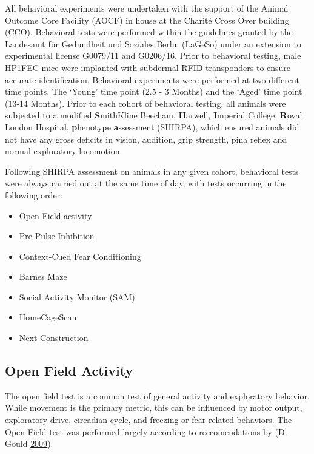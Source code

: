 \documentclass[onehalf,12pt]{beavtex}
\providecommand{\tightlist}{%
  \setlength{\itemsep}{0pt}\setlength{\parskip}{0pt}}
\begin{document}
  All behavioral experiments were undertaken with the support of the
  Animal Outcome Core Facility (AOCF) in house at the Charité Cross Over
  building (CCO). Behavioral tests were performed within the guidelines
  granted by the Landesamt für Gedundheit und Soziales Berlin (LaGeSo)
  under an extension to experimental license G0079/11 and G0206/16. Prior
  to behavioral testing, male HP1FEC mice were implanted with subdermal
  RFID transponders to ensure accurate identification. Behavioral
  experiments were performed at two different time points. The `Young'
  time point (2.5 - 3 Months) and the `Aged' time point (13-14 Months).
  Prior to each cohort of behavioral testing, all animals were subjected
  to a modified \textbf{S}mithKline Beecham, \textbf{H}arwell,
  \textbf{I}mperial College, \textbf{R}oyal London Hospital,
  \textbf{p}henotype \textbf{a}ssessment (SHIRPA), which ensured animals
  did not have any gross deficits in vision, audition, grip strength, pina
  reflex and normal exploratory locomotion.
  
  Following SHIRPA assessment on animals in any given cohort, behavioral
  tests were always carried out at the same time of day, with tests
  occurring in the following order:
  
  \begin{itemize}
  \tightlist
  \item
    Open Field activity
  \item
    Pre-Pulse Inhibition
  \item
    Context-Cued Fear Conditioning
  \item
    Barnes Maze
  \item
    Social Activity Monitor (SAM)
  \item
    HomeCageScan
  \item
    Next Construction
  \end{itemize}
  
  \subsection{Open Field Activity}\label{open-field-activity-1}
  
  The open field test is a common test of general activity and exploratory
  behavior. While movement is the primary metric, this can be influenced
  by motor output, exploratory drive, circadian cycle, and freezing or
  fear-related behaviors. The Open Field test was performed largely
  according to reccomendations by (D. Gould
  \protect\hyperlink{ref-Gouldbook2009}{2009}).
  
\end{document}
